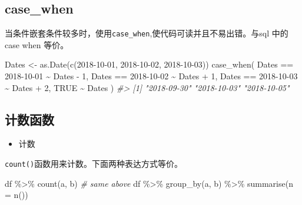 \documentclass[
]{book}
\newenvironment{Shaded}{\begin{snugshade}}{\end{snugshade}}
\newcommand{\AttributeTok}[1]{\textcolor[rgb]{0.77,0.63,0.00}{#1}}
\newcommand{\CommentTok}[1]{\textcolor[rgb]{0.56,0.35,0.01}{\textit{#1}}}
\newcommand{\ConstantTok}[1]{\textcolor[rgb]{0.00,0.00,0.00}{#1}}
\newcommand{\DecValTok}[1]{\textcolor[rgb]{0.00,0.00,0.81}{#1}}
\newcommand{\FunctionTok}[1]{\textcolor[rgb]{0.00,0.00,0.00}{#1}}
\newcommand{\NormalTok}[1]{#1}
\newcommand{\OtherTok}[1]{\textcolor[rgb]{0.56,0.35,0.01}{#1}}
\newcommand{\SpecialCharTok}[1]{\textcolor[rgb]{0.00,0.00,0.00}{#1}}
\newcommand{\StringTok}[1]{\textcolor[rgb]{0.31,0.60,0.02}{#1}}
\providecommand{\tightlist}{%
  \setlength{\itemsep}{0pt}\setlength{\parskip}{0pt}}
\begin{document}
\hypertarget{case_when}{%
\subsection{case\_when}\label{case_when}}

当条件嵌套条件较多时，使用\texttt{case\_when},使代码可读并且不易出错。与sql 中的case when 等价。

\begin{Shaded}
\begin{Highlighting}[]
\NormalTok{Dates }\OtherTok{\textless{}{-}} \FunctionTok{as.Date}\NormalTok{(}\FunctionTok{c}\NormalTok{(}\StringTok{\textquotesingle{}2018{-}10{-}01\textquotesingle{}}\NormalTok{, }\StringTok{\textquotesingle{}2018{-}10{-}02\textquotesingle{}}\NormalTok{, }\StringTok{\textquotesingle{}2018{-}10{-}03\textquotesingle{}}\NormalTok{))}
\FunctionTok{case\_when}\NormalTok{(}
\NormalTok{  Dates }\SpecialCharTok{==} \StringTok{\textquotesingle{}2018{-}10{-}01\textquotesingle{}} \SpecialCharTok{\textasciitilde{}}\NormalTok{ Dates }\SpecialCharTok{{-}} \DecValTok{1}\NormalTok{,}
\NormalTok{  Dates }\SpecialCharTok{==} \StringTok{\textquotesingle{}2018{-}10{-}02\textquotesingle{}} \SpecialCharTok{\textasciitilde{}}\NormalTok{ Dates }\SpecialCharTok{+} \DecValTok{1}\NormalTok{,}
\NormalTok{  Dates }\SpecialCharTok{==} \StringTok{\textquotesingle{}2018{-}10{-}03\textquotesingle{}} \SpecialCharTok{\textasciitilde{}}\NormalTok{ Dates }\SpecialCharTok{+} \DecValTok{2}\NormalTok{,}
  \ConstantTok{TRUE} \SpecialCharTok{\textasciitilde{}}\NormalTok{ Dates}
\NormalTok{)}
\CommentTok{\#\textgreater{} [1] "2018{-}09{-}30" "2018{-}10{-}03" "2018{-}10{-}05"}
\end{Highlighting}
\end{Shaded}

\hypertarget{ux8ba1ux6570ux51fdux6570}{%
\subsection{计数函数}\label{ux8ba1ux6570ux51fdux6570}}

\begin{itemize}
\tightlist
\item
  计数
\end{itemize}

\texttt{count()}函数用来计数。下面两种表达方式等价。

\begin{Shaded}
\begin{Highlighting}[]
\NormalTok{df }\SpecialCharTok{\%\textgreater{}\%} \FunctionTok{count}\NormalTok{(a, b)}
\CommentTok{\# same above}
\NormalTok{df }\SpecialCharTok{\%\textgreater{}\%} \FunctionTok{group\_by}\NormalTok{(a, b) }\SpecialCharTok{\%\textgreater{}\%} \FunctionTok{summarise}\NormalTok{(}\AttributeTok{n =} \FunctionTok{n}\NormalTok{())}
\end{Highlighting}
\end{Shaded}
\end{document}

